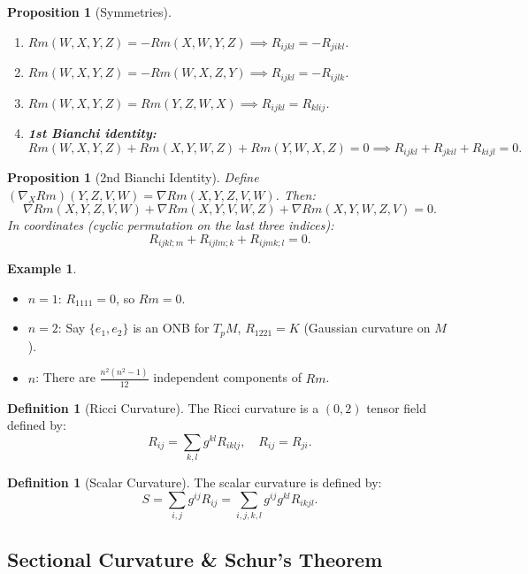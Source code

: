 \documentclass[11pt, a4paper]{article}
\theoremstyle{plain}
\newtheorem{proposition}[theorem]{Proposition}
\theoremstyle{definition}
\newtheorem{definition}[theorem]{Definition}
\newtheorem{example}[theorem]{Example}
\theoremstyle{remark}
\begin{document}
{\begin{proposition}[Symmetries]
\begin{enumerate}
    \item $Rm(W,X,Y,Z) = -Rm(X,W,Y,Z) \implies R_{ijkl} = -R_{jikl}$.
    \item $Rm(W,X,Y,Z) = -Rm(W,X,Z,Y) \implies R_{ijkl} = -R_{ijlk}$.
    \item $Rm(W,X,Y,Z) = Rm(Y,Z,W,X) \implies R_{ijkl} = R_{klij}$.
    \item \textbf{1st Bianchi identity:} 
    \[ Rm(W,X,Y,Z) + Rm(X,Y,W,Z) + Rm(Y,W,X,Z) = 0 \implies R_{ijkl} + R_{jkil} + R_{kijl} = 0. \]
\end{enumerate}
\end{proposition}

\begin{proposition}[2nd Bianchi Identity]
Define $(\nabla_X Rm)(Y,Z,V,W) = \nabla Rm(X,Y,Z,V,W)$. Then:
\[ \nabla Rm(X,Y,Z,V,W) + \nabla Rm(X,Y,V,W,Z) + \nabla Rm(X,Y,W,Z,V) = 0. \]
In coordinates (cyclic permutation on the last three indices):
\[ R_{ijkl;m} + R_{ijlm;k} + R_{ijmk;l} = 0. \]
\end{proposition}

\begin{example}
\begin{itemize}
    \item $n=1$: $R_{1111} = 0$, so $Rm = 0$.
    \item $n=2$: Say $\{e_1, e_2\}$ is an ONB for $T_p M$, $R_{1221} = K$ (Gaussian curvature on $M$).
    \item $n$: There are $\frac{n^2(n^2-1)}{12}$ independent components of $Rm$.
\end{itemize}
\end{example}

\begin{definition}[Ricci Curvature]
The Ricci curvature is a $(0,2)$ tensor field defined by:
\[ R_{ij} = \sum_{k,l} g^{kl} R_{iklj}, \quad R_{ij} = R_{ji}. \]
\end{definition}

\begin{definition}[Scalar Curvature]
The scalar curvature is defined by:
\[ S = \sum_{i,j} g^{ij} R_{ij} = \sum_{i,j,k,l} g^{ij} g^{kl} R_{ikjl}. \]
\end{definition}

\vspace{1cm}

\subsection{Sectional Curvature \& Schur's Theorem}

}
\end{document}
